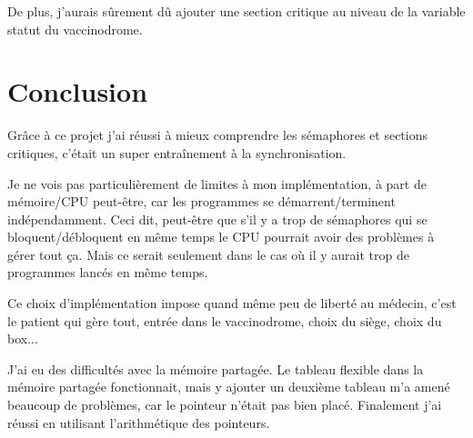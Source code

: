\documentclass[a4paper]{article}
\begin{document}
  De plus, j'aurais sûrement dû ajouter une section critique au niveau de la variable statut du vaccinodrome.

  \section{Conclusion}

  Grâce à ce projet j'ai réussi à mieux comprendre les sémaphores et sections critiques, c'était un super  entraînement à la synchronisation.\par
  Je ne vois pas particulièrement de limites à mon implémentation, à part de mémoire/CPU peut-être, car les programmes se démarrent/terminent indépendamment. Ceci dit, peut-être que s'il y a trop de sémaphores qui se bloquent/débloquent en même temps le CPU pourrait avoir des problèmes à gérer tout ça. Mais ce serait seulement dans le cas où il y aurait trop de programmes lancés en même temps.\par
  Ce choix d'implémentation impose quand même peu de liberté au médecin, c'est le patient qui gère tout, entrée dans le vaccinodrome, choix du siège, choix du box...\par
  J'ai eu des difficultés avec la mémoire partagée. Le tableau flexible dans la mémoire partagée fonctionnait, mais y ajouter un deuxième tableau m'a amené beaucoup de problèmes, car le pointeur n'était pas bien placé. Finalement j'ai réussi en utilisant l'arithmétique des pointeurs.
\end{document}
